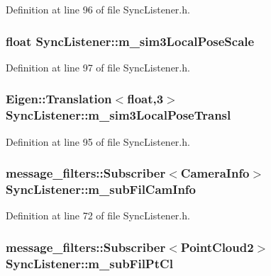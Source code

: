 \-Definition at line 96 of file \-Sync\-Listener.\-h.

\hypertarget{classSyncListener_aaf3e2d41bade5563773335eb7dcea484}{
\subsubsection[{m\-\_\-sim3\-Local\-Pose\-Scale}]{\setlength{\rightskip}{0pt plus 5cm}float {\bf \-Sync\-Listener\-::m\-\_\-sim3\-Local\-Pose\-Scale}}}\label{classSyncListener_aaf3e2d41bade5563773335eb7dcea484}


\-Definition at line 97 of file \-Sync\-Listener.\-h.

\hypertarget{classSyncListener_a1dc58db5a86d88a47fdad97920a31d4c}{
\subsubsection[{m\-\_\-sim3\-Local\-Pose\-Transl}]{\setlength{\rightskip}{0pt plus 5cm}\-Eigen\-::\-Translation$<$float,3$>$ {\bf \-Sync\-Listener\-::m\-\_\-sim3\-Local\-Pose\-Transl}}}\label{classSyncListener_a1dc58db5a86d88a47fdad97920a31d4c}


\-Definition at line 95 of file \-Sync\-Listener.\-h.

\hypertarget{classSyncListener_a8a2f8f014180ef641c4f23edc60f7f65}{
\subsubsection[{m\-\_\-sub\-Fil\-Cam\-Info}]{\setlength{\rightskip}{0pt plus 5cm}message\-\_\-filters\-::\-Subscriber$<$\-Camera\-Info$>$ {\bf \-Sync\-Listener\-::m\-\_\-sub\-Fil\-Cam\-Info}}}\label{classSyncListener_a8a2f8f014180ef641c4f23edc60f7f65}


\-Definition at line 72 of file \-Sync\-Listener.\-h.

\hypertarget{classSyncListener_ac23b28241b0e85d1247f3bb116bdfeaf}{
\subsubsection[{m\-\_\-sub\-Fil\-Pt\-Cl}]{\setlength{\rightskip}{0pt plus 5cm}message\-\_\-filters\-::\-Subscriber$<$\-Point\-Cloud2$>$ {\bf \-Sync\-Listener\-::m\-\_\-sub\-Fil\-Pt\-Cl}}}\label{classSyncListener_ac23b28241b0e85d1247f3bb116bdfeaf}


